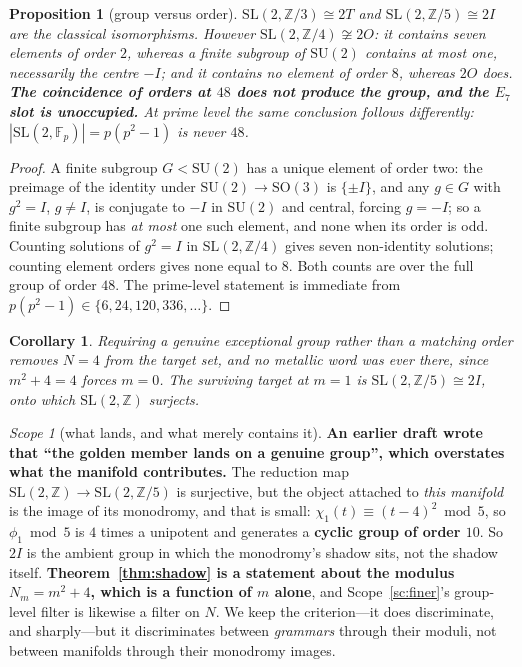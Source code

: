 \documentclass[11pt,reqno]{amsart}
\theoremstyle{plain}
\newtheorem{proposition}[theorem]{Proposition}
\newtheorem{corollary}[theorem]{Corollary}
\theoremstyle{definition}
\theoremstyle{remark}
\newtheorem{scope}[theorem]{Scope}
\newcommand{\Z}{\mathbb{Z}}
\newcommand{\SL}{\mathrm{SL}}
\newcommand{\SU}{\mathrm{SU}}
\begin{document}
\begin{proposition}[group versus order]\label{prop:group}
$\SL(2,\Z/3)\cong2T$ and $\SL(2,\Z/5)\cong2I$ are the classical isomorphisms. However
$\SL(2,\Z/4)\not\cong2O$: it contains seven elements of order $2$, whereas a finite
subgroup of $\SU(2)$ contains \emph{at most} one, necessarily the centre $-I$; and it contains no
element of order $8$, whereas $2O$ does. \textbf{The coincidence of orders at $48$ does
not produce the group, and the $E_7$ slot is unoccupied.} At prime level the same
conclusion follows differently: $|\SL(2,\mathbb F_p)|=p(p^2-1)$ is never $48$.
\end{proposition}

\begin{proof}
A finite subgroup $G<\SU(2)$ has a unique element of order two: the preimage of the
identity under $\SU(2)\to\mathrm{SO}(3)$ is $\{\pm I\}$, and any $g\in G$ with $g^2=I$,
$g\neq I$, is conjugate to $-I$ in $\SU(2)$ and central, forcing $g=-I$; so a finite
subgroup has \emph{at most} one such element, and none when its order is odd. Counting
solutions of $g^2=I$ in $\SL(2,\Z/4)$ gives seven non-identity solutions; counting
element orders gives none equal to $8$. Both counts are over the full group of order
$48$. The prime-level statement is immediate from $p(p^2-1)\in\{6,24,120,336,\dots\}$.
\end{proof}

\begin{corollary}
Requiring a genuine exceptional \emph{group} rather than a matching order removes $N=4$
from the target set, and no metallic word was ever there, since $m^2+4=4$ forces $m=0$.
The surviving target at $m=1$ is $\SL(2,\Z/5)\cong2I$, onto which $\SL(2,\Z)$ surjects.
\end{corollary}

\begin{scope}[what lands, and what merely contains it]\label{sc:landing}
\textbf{An earlier draft wrote that ``the golden member lands on a genuine group'', which
overstates what the manifold contributes.} The reduction map
$\SL(2,\Z)\to\SL(2,\Z/5)$ is surjective, but the object attached to \emph{this manifold}
is the image of its monodromy, and that is small: $\chi_1(t)\equiv(t-4)^2 \bmod 5$, so
$\phi_1\bmod5$ is $4$ times a unipotent and generates a \textbf{cyclic group of order
$10$}. So $2I$ is the ambient group in which the monodromy's shadow sits, not the shadow
itself. \textbf{Theorem~\ref{thm:shadow} is a statement about the modulus $N_m=m^2+4$,
which is a function of $m$ alone}, and Scope~\ref{sc:finer}'s group-level filter is
likewise a filter on $N$. We keep the criterion---it does discriminate, and sharply---but
it discriminates between \emph{grammars} through their moduli, not between manifolds
through their monodromy images.
\end{scope}
\end{document}
